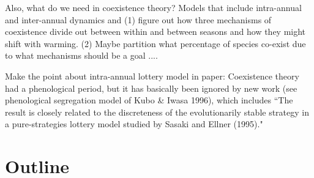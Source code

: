 \documentclass[11pt]{article}
\begin{document}
Also, what do we need in coexistence theory? Models that include intra-annual and inter-annual dynamics and (1) figure out how three mechanisms of coexistence divide out between within and between seasons and how they might shift with warming. (2) Maybe partition what percentage of species co-exist due to what mechanisms should be a goal .... 

Make the point about intra-annual lottery model in paper: Coexistence theory had a phenological period, but it has basically been ignored by new work (see phenological segregation model of Kubo \& Iwasa 1996), which includes ``The result is closely related to the discreteness of the evolutionarily stable strategy in a pure-strategies lottery model studied by Sasaki and Ellner (1995)." 



\section{Outline}
\end{document}

